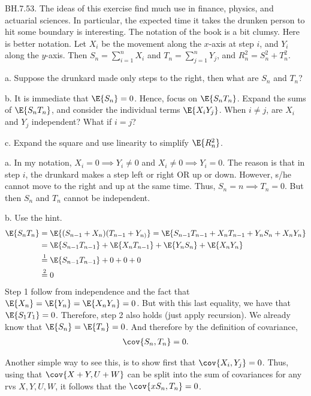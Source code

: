 
\setcounter{theorem}{52}
\begin{exercise}BH.7.53.
The ideas of this exercise find much use in finance, physics, and actuarial sciences.
In particular, the expected time it takes the drunken person to hit some boundary is interesting. The notation of the book is a bit clumsy. Here is better notation.
Let $X_i$ be the movement along the \(x\)-axis at step $i$, and $Y_i$ along the $y$-axis.
Then $S_n=\sum_{i=1}^n X_i$ and $T_n=\sum_{j=1}^n Y_{j}$, and $R_n^2= S_n^2+T_n^2$.
\begin{hint}
a. Suppose the drunkard made only steps to the right, then what are $S_{n}$ and $T_{n}$?

b. It is immediate that $\E{S_n} = 0$.
Hence, focus on $\E{S_n T_n}$. Expand  the sums of $\E{S_n T_n}$, and consider the individual terms $\E{X_i Y_j}$. When $i\neq j$, are $X_i$ and $Y_{j}$  independent? What if  $i=j$?

c. Expand the square and  use linearity to simplify  $\E{R^2_n}$.
\end{hint}

\begin{solution}
a. In my notation, $X_i=0 \implies Y_i\neq 0$ and $X_i\neq 0 \implies Y_i=0$. The reason is that in step $i$, the drunkard makes a step left or right OR up or down. However, s/he cannot move to the right and up at the same time. Thus, $S_{n} = n \implies T_n = 0.$ But then $S_n$ and $T_n$ cannot be independent.

b. Use the hint.
\begin{align*}
  \E{S_nT_{n}}
  &= \E{(S_{n-1} + X_{n})(T_{n-1}+Y_{n)}} = \E{S_{n-1} T_{n-1}+ X_{n}T_{n-1}+Y_{n}S_{n} + X_{n}Y_{n}} \\
  &= \E{S_{n-1} T_{n-1}}+ \E{X_{n}T_{n-1}}+ \E{Y_{n}S_{n}} + \E{X_{n}Y_{n}} \\
  &\stackrel 1= \E{S_{n-1} T_{n-1}}+ 0 + 0 + 0 \\
  &\stackrel 2=0
\end{align*}
 Step 1 follow from independence and the fact that $\E{X_n} = \E{Y_n} = \E{X_nY_n} = 0$. But with this last equality, we have that  $\E{S_1T_{1}} = 0$. Therefore, step 2 also holds (just apply recursion). We already know that $\E{S_n} = \E{T_n} = 0$. And therefore by the definition of covariance,
\begin{align*}
  \cov{S_n,T_{n}} = 0.
\end{align*}

Another simple way to see this, is to show first that $\cov{X_{i}, Y_{j}} = 0$. Thus, using that $\cov{X+Y, U+W}$ can be split into the sum of covariances for any rvs $X,Y,U,W$, it follows that the $\cov{xS_{n}, T_{n}} = 0$.


\end{solution}
\end{exercise}
